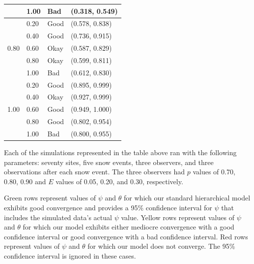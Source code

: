 \documentclass[12pt]{article}
\begin{document}
\begin{center}
\begin{tabular}{|l|l|l|l|}
            & \cellcolor{Red}1.00 & \cellcolor{Red}Bad &
              \cellcolor{Red}(0.318, 0.549) \\
        \hline
        \multirow{5}{*}{0.80}
            & \cellcolor{Green}0.20 & \cellcolor{Green}Good &
              \cellcolor{Green}(0.578, 0.838) \\
            & \cellcolor{Green}0.40 & \cellcolor{Green}Good &
              \cellcolor{Green}(0.736, 0.915) \\
            & \cellcolor{Yellow}0.60 & \cellcolor{Yellow}Okay &
              \cellcolor{Yellow}(0.587, 0.829) \\
            & \cellcolor{Yellow}0.80 & \cellcolor{Yellow}Okay &
              \cellcolor{Yellow}(0.599, 0.811) \\
            & \cellcolor{Red}1.00 & \cellcolor{Red}Bad &
              \cellcolor{Red}(0.612, 0.830) \\
        \hline
        \multirow{5}{*}{1.00}
            & \cellcolor{Yellow}0.20 & \cellcolor{Yellow}Good &
              \cellcolor{Yellow}(0.895, 0.999) \\
            & \cellcolor{Yellow}0.40 & \cellcolor{Yellow}Okay &
              \cellcolor{Yellow}(0.927, 0.999) \\
            & \cellcolor{Green}0.60 & \cellcolor{Green}Good &
              \cellcolor{Green}(0.949, 1.000) \\
            & \cellcolor{Yellow}0.80 & \cellcolor{Yellow}Good &
              \cellcolor{Yellow}(0.802, 0.954) \\
            & \cellcolor{Red}1.00 & \cellcolor{Red}Bad &
              \cellcolor{Red}(0.800, 0.955) \\
        \hline
    \end{tabular}
    \end{center}

    Each of the simulations represented in the table above ran with the
    following parameters: seventy sites, five snow events, three observers, and
    three observations after each snow event. The three observers had \(p\)
    values of 0.70, 0.80, 0.90 and \(E\) values of 0.05, 0.20, and 0.30,
    respectively.

    Green rows represent values of \(\psi\) and \(\theta\) for which our
    standard hierarchical model exhibits good convergence and provides a 95\%
    confidence interval for \(\psi\) that includes the simulated data's actual
    \(\psi\) value.  Yellow rows represent values of \(\psi\) and \(\theta\) for
    which our model exhibits either mediocre convergence with a good confidence
    interval or good convergence with a bad confidence interval.  Red rows
    represent values of \(\psi\) and \(\theta\) for which our model does not
    converge.  The 95\% confidence interval is ignored in these cases.
\end{document}
